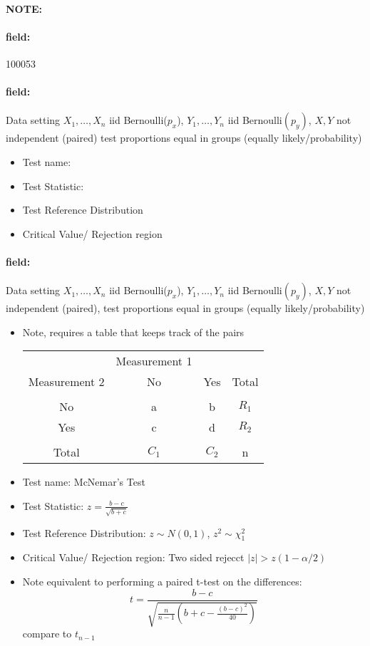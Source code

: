 \documentclass[12pt]{article}
\newenvironment{note}{\paragraph{NOTE:}}{}
\newenvironment{field}{\paragraph{field:}}{}
\begin{document}
\begin{note} \begin{field} \tiny 100053 \end{field}
 \begin{field}
  Data setting $X_1, \ldots , X_n$ iid Bernoulli($p_x$), $Y_1, \ldots, Y_n$ iid Bernoulli$(p_y)$, $X,Y$ not independent (paired) test proportions equal in groups (equally likely/probability)
  \begin{itemize}
   \item Test name:
   \item Test Statistic:
   \item Test Reference Distribution
   \item Critical Value/ Rejection region
  \end{itemize}
 \end{field}
 \begin{field}
  Data setting $X_1, \ldots , X_n$ iid Bernoulli($p_x$), $Y_1, \ldots, Y_n$ iid Bernoulli$(p_y)$, $X,Y$ not independent (paired), test proportions equal in groups (equally likely/probability)
  \begin{itemize}

   \item Note, requires a table that keeps track of the pairs
   \begin{tabular}{|c|c c|c|}
     & Measurement 1 & & \\
     Measurement 2 & No & Yes & Total \\
     \hline\\
     No & a & b & $R_1$\\
     Yes & c & d & $R_2$\\
     \hline \\
     Total & $C_1$ & $C_2$ & n\\
     \hline
  \end{tabular}
   \item Test name: McNemar's Test
   \item Test Statistic: $z = \frac{b-c}{\sqrt{b+c}}$
   \item Test Reference Distribution: $z \sim N(0,1)$, $z^2 \sim \chi_1^2$
   \item Critical Value/ Rejection region: Two sided rejecct $|z| > z(1 - \alpha/2)$
   \item Note equivalent to performing a paired t-test on the differences:
         $$ t = \frac{b-c}{\sqrt{\frac{n}{n-1}(b + c - \frac{(b-c)^2}{40})}} $$ compare to $t_{n-1}$
  \end{itemize}
 \end{field}
\end{note}
\end{document}
